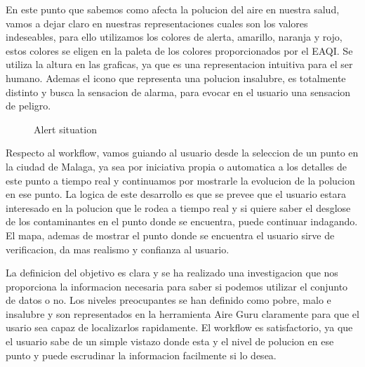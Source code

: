 En este punto que sabemos como afecta la polucion del aire en nuestra salud, vamos a dejar claro en nuestras representaciones cuales son los valores indeseables,
para ello utilizamos los colores de alerta, amarillo, naranja y rojo, estos colores se eligen en la paleta de los colores proporcionados por el EAQI.
Se utiliza la altura en las graficas, ya que es una representacion intuitiva para el ser humano. Ademas el icono que representa una polucion insalubre, es 
totalmente distinto y busca la sensacion de alarma, para evocar en el usuario una sensacion de peligro.\\
\newpage
\begin{figure}[ht]
    \centering
    \hfill
  
  \caption{Alert situation}
    \end{figure}

Respecto al workflow, vamos guiando al usuario desde la seleccion de un punto en la ciudad de Malaga, ya sea por iniciativa propia 
o automatica a los detalles de este punto a tiempo real y continuamos por mostrarle la evolucion de la polucion en ese punto.
La logica de este desarrollo es que se prevee que el usuario estara interesado en la polucion que le rodea a tiempo real y si 
quiere saber el desglose de los contaminantes en el punto donde se encuentra, puede continuar indagando. El mapa, ademas de mostrar
el punto donde se encuentra el usuario sirve de verificacion, da mas realismo y confianza al usuario.

\begin{itemize}
    \done La definicion del objetivo es clara y se ha realizado una investigacion que nos proporciona la informacion necesaria
    para saber si podemos utilizar el conjunto de datos o no.
    \done Los niveles preocupantes se han definido como pobre, malo e insalubre y son representados en la herramienta Aire Guru
    claramente para que el usario sea capaz de localizarlos rapidamente.
    \done El workflow es satisfactorio, ya que el usuario sabe de un simple vistazo donde esta y el nivel de polucion en ese punto 
    y puede escrudinar la informacion facilmente si lo desea.
    
\end{itemize}
 

\newpage